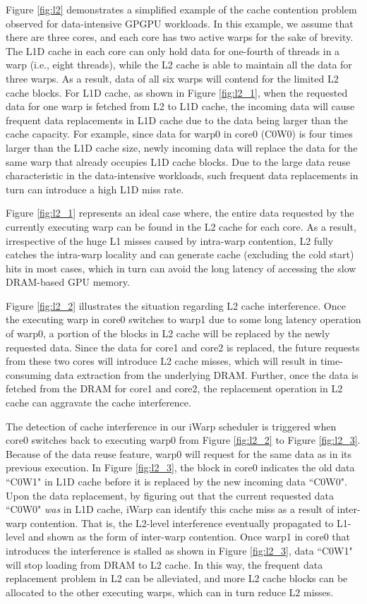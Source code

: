 \documentclass{sigplanconf}
\begin{document}
Figure \ref{fig:l2} demonstrates a simplified example of the cache contention problem observed for data-intensive GPGPU workloads. In this example, we assume that there are three cores, and each core has two active warps for the sake of brevity. The L1D cache in each core can only hold data for one-fourth of threads in a warp (i.e., eight threads), while the L2 cache is able to maintain all the data for three warps. As a result, data of all six warps will contend for the limited L2 cache blocks. For L1D cache, as shown in Figure \ref{fig:l2_1}, when the requested data for one warp is fetched from L2 to L1D cache, the incoming data will cause frequent data replacements in L1D cache due to the data being larger than the cache capacity. For example, since data for warp0 in core0 (C0W0) is four times larger than the L1D cache size, newly incoming data will replace the data for the same warp that already occupies L1D cache blocks. Due to the large data reuse characteristic in the data-intensive workloads, such frequent data replacements in turn can introduce a high L1D miss rate.

Figure \ref{fig:l2_1} represents an ideal case where, the entire data requested by the currently executing warp can be found in the L2 cache for each core. As a result, irrespective of the huge L1 misses caused by intra-warp contention, L2 fully catches the intra-warp locality and can generate cache (excluding the cold start) hits in most cases, which in turn can avoid the long latency of accessing the slow DRAM-based GPU memory.

Figure \ref{fig:l2_2} illustrates the situation regarding L2 cache interference. Once the executing warp in core0 switches to warp1 due to some long latency operation of warp0, a portion of the blocks in L2 cache will be replaced by the newly requested data. Since the data for core1 and core2 is replaced, the future requests from these two cores will introduce L2 cache misses, which will result in time-consuming data extraction from the underlying DRAM. Further, once the data is fetched from the DRAM for core1 and core2, the replacement operation in L2 cache can aggravate the cache interference.

The detection of cache interference in our iWarp scheduler is triggered when core0 switches back to executing warp0 from Figure \ref{fig:l2_2} to Figure \ref{fig:l2_3}. Because of the data reuse feature, warp0 will request for the same data as in its previous execution. In Figure \ref{fig:l2_3}, the block in core0 indicates the old data ``C0W1" in L1D cache before it is replaced by the new incoming data ``C0W0". Upon the data replacement, by figuring out that the current requested data ``C0W0" \textit{was} in L1D cache, iWarp can identify this cache miss as a result of inter-warp contention. That is, the L2-level interference eventually propagated to L1-level and shown as the form of inter-warp contention. Once warp1 in core0 that introduces the interference is stalled as shown in Figure \ref{fig:l2_3}, data ``C0W1" will stop loading from DRAM to L2 cache. In this way, the frequent data replacement problem in L2 can be alleviated, and more L2 cache blocks can be allocated to the other executing warps, which can in turn reduce L2 misses.
\end{document}
